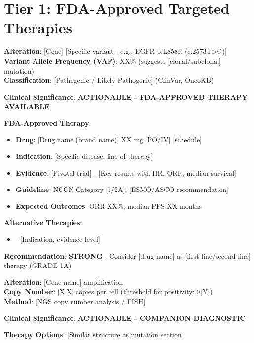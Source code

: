 \documentclass[10pt,letterpaper]{article}
\begin{document}
\section{Tier 1: FDA-Approved Targeted Therapies}

\begin{tcolorbox}[enhanced,colback=tier1green!5,colframe=tier1green,
title={\colorbox{mutationred!60}{\textcolor{white}{\textbf{MUTATION}}} \textbf{[Gene Name] [Alteration]} \hfill \textbf{TIER 1 - ACTIONABLE}},
fonttitle=\bfseries\small,coltitle=black]
{\small
\textbf{Alteration}: [Gene] [Specific variant - e.g., EGFR p.L858R (c.2573T>G)]\\
\textbf{Variant Allele Frequency (VAF)}: XX\% (suggests [clonal/subclonal] mutation)\\
\textbf{Classification}: [Pathogenic / Likely Pathogenic] (ClinVar, OncoKB)

\textbf{Clinical Significance}: \textcolor{tier1green}{\textbf{ACTIONABLE - FDA-APPROVED THERAPY AVAILABLE}}

\textbf{FDA-Approved Therapy}:
\begin{itemize}
\item \textbf{Drug}: [Drug name (brand name)] XX mg [PO/IV] [schedule]
\item \textbf{Indication}: [Specific disease, line of therapy]
\item \textbf{Evidence}: [Pivotal trial] - [Key results with HR, ORR, median survival]
\item \textbf{Guideline}: NCCN Category [1/2A], [ESMO/ASCO recommendation]
\item \textbf{Expected Outcomes}: ORR XX\%, median PFS XX months
\end{itemize}

\textbf{Alternative Therapies}:
\begin{itemize}
\item [Alternative drug] - [Indication, evidence level]
\end{itemize}

\textbf{Recommendation}: \textbf{STRONG} - Consider [drug name] as [first-line/second-line] therapy (GRADE 1A)
}
\end{tcolorbox}

\vspace{3pt}

\begin{tcolorbox}[enhanced,colback=tier1green!5,colframe=tier1green,
title={\colorbox{amplificationblue!60}{\textcolor{white}{\textbf{AMPLIFICATION}}} \textbf{[Gene] Amplification} \hfill \textbf{TIER 1}},
fonttitle=\bfseries\small,coltitle=black]
{\small
\textbf{Alteration}: [Gene name] amplification\\
\textbf{Copy Number}: [X.X] copies per cell (threshold for positivity: ≥[Y])\\
\textbf{Method}: [NGS copy number analysis / FISH]

\textbf{Clinical Significance}: \textcolor{tier1green}{\textbf{ACTIONABLE - COMPANION DIAGNOSTIC}}

\textbf{Therapy Options}: [Similar structure as mutation section]
}
\end{tcolorbox}
\end{document}
